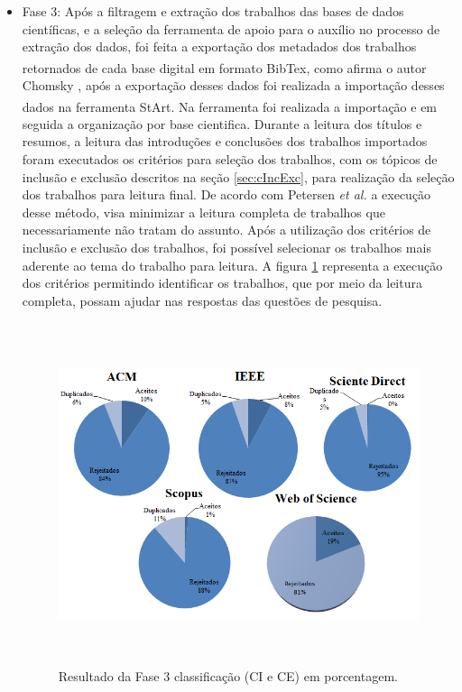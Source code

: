 \begin{itemize}
\item Fase 3: Após a filtragem e extração dos trabalhos das bases de dados científicas, e a seleção da ferramenta de apoio para o auxílio no processo de extração dos dados, foi feita a exportação dos metadados dos trabalhos retornados de cada base digital em formato BibTex\textsuperscript{\textregistered}, como afirma o autor Chomsky \cite{chomsky1969linguistica}, após a exportação desses dados foi realizada a importação desses dados na ferramenta \acrshort{StArt}\textsuperscript{\textregistered}. Na ferramenta foi realizada a importação e em seguida a organização por base cientifica. Durante a leitura dos títulos e resumos, a leitura das introduções e conclusões dos trabalhos importados foram executados os critérios para seleção dos trabalhos, com os tópicos de inclusão e exclusão descritos na seção \ref{sec:cIncExc}, para realização da seleção dos trabalhos para leitura final. De acordo com Petersen \textit{et al.} \cite{petersen2008systematic} a execução desse método, visa minimizar a leitura completa de trabalhos que necessariamente não tratam do assunto. Após a utilização dos critérios de inclusão e exclusão dos trabalhos, foi possível selecionar os trabalhos mais aderente ao tema do trabalho para leitura. A figura \ref{fig:fase3Criterios} representa a execução dos critérios permitindo identificar os trabalhos, que por meio da leitura completa, possam ajudar nas respostas das questões de pesquisa.  


\begin{figure}[!htb]
\centering
\includegraphics[width = 13cm, height=10cm]{img/Classificacao_FASE_3_CI_e_CE.png}
\caption{Resultado da Fase 3 classificação (CI e CE) em porcentagem.}
\label{fig:fase3Criterios}
\end{figure}


\end{itemize}
